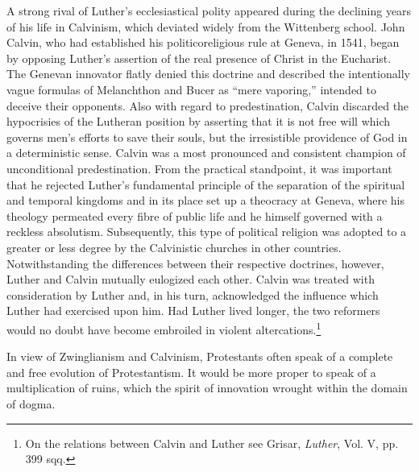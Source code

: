 A strong rival of Luther’s ecclesiastical polity appeared during the
declining years of his life in Calvinism, which deviated widely from
the Wittenberg school. John Calvin, who had established his politicoreligious
rule at Geneva, in 1541, began by opposing Luther’s assertion of the real
presence of Christ in the Eucharist. The Genevan
innovator flatly denied this doctrine and described the intentionally
vague formulas of Melanchthon and Bucer as “mere vaporing,” intended to
deceive their opponents. Also with regard to predestination,
Calvin discarded the hypocrisies of the Lutheran position by
asserting that it is not free will which governs men’s efforts to save
their souls, but the irresistible providence of God in a deterministic
sense. Calvin was a most pronounced and consistent champion of
unconditional predestination. From the practical standpoint, it was
important that he rejected Luther’s fundamental principle of the
separation of the spiritual and temporal kingdoms and in its place set
up a theocracy at Geneva, where his theology permeated every fibre
of public life and he himself governed with a reckless absolutism.
Subsequently, this type of political religion was adopted to a greater
or less degree by the Calvinistic churches in other countries. Notwithstanding
the differences between their respective doctrines, however, Luther and
Calvin mutually eulogized each other. Calvin was
treated with consideration by Luther and, in his turn, acknowledged
the influence which Luther had exercised upon him. Had Luther
lived longer, the two reformers would no doubt have become embroiled in
violent altercations.\footnote{On the relations between Calvin and Luther see Grisar, \textit{Luther}, Vol. V, pp. 399 sqq.}

In view of Zwinglianism and Calvinism, Protestants often speak
of a complete and free evolution of Protestantism. It would be more
proper to speak of a multiplication of ruins, which the spirit of innovation
wrought within the domain of dogma.

